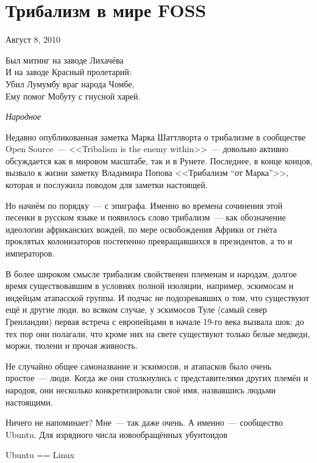 \section{Трибализм в мире FOSS} 
\begin{timeline}Август 8, 2010\end{timeline}

\hfill \begin{minipage}[h]{0.45\textwidth}
Был митинг на заводе Лихачёва \\
И на заводе Красный пролетарий:\\
Убил Лумумбу враг народа Чомбе,\\
Ему помог Мобуту с гнусной харей.
\begin{flushright}
\textit{Народное}
\end{flushright}
\bigskip\end{minipage}

Недавно опубликованная заметка Марка Шаттлворта о трибализме в сообществе Open Source~--- <<Tribalism is the enemy within>>~---  довольно активно обсуждается как в мировом масштабе, так и в Рунете. Последнее, в конце концов, вызвало к жизни заметку Владимира Попова <<Трибализм ``от Марка''>>, которая и послужила поводом для заметки настоящей.

Но начнём по порядку~--- с эпиграфа.
 Именно во времена сочинения этой песенки в русском языке и появилось слово трибализм~--- как обозначение идеологии африканских вождей, по мере освобождения Африки от гнёта проклятых колонизаторов постепенно превращавшихся в президентов, а то и императоров.

В более широком смысле трибализм свойственен племенам и народам, долгое время существовавшим в условиях полной изоляции, например, эскимосам и индейцам атапасской группы. И подчас не подозревавших о том, что существуют ещё и другие люди. во всяком случае, у эскимосов Туле (самый север Гренландии) первая встреча с европейцами в начале 19-го века вызвала шок: до тех пор они полагали, что кроме них на свете существуют только белые медведи, моржи, тюлени и прочая живность.

Не случайно общее самоназвание и эскимосов, и атапасков было очень простое~--- люди. Когда же они столкнулись с представителями других племён и народов, они несколько конкретизировали своё имя, назвавшись людьми настоящими.

Ничего не напоминает? Мне~--- так даже очень. А именно~--- сообщество Ubuntu. Для изрядного числа новообращённых убунтоидов
\large\begin{shadequote}{}
Ubuntu == Linux
\end{shadequote}\normalsize

